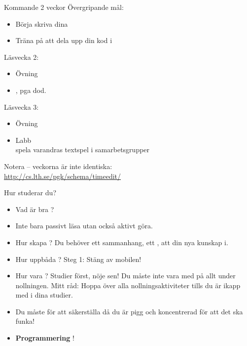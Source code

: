 \begin{SlideExtra}{Kommande 2 veckor}
Övergripande mål:
\begin{itemize}
\item Börja skriva dina 
\item Träna på att dela upp din kod i 
\end{itemize}

Läsvecka 2:
\begin{itemize}
\item Övning \texttt{\ExeWeekTWO}
\item {} , pga dod.
\end{itemize}
Läsvecka 3:
\begin{itemize}
\item Övning \texttt{\ExeWeekTHREE}
\item Labb \texttt{\LabWeekTHREE}  \\ spela varandras textspel i samarbetsgrupper
\end{itemize}

\vspace{1em} Notera  -- veckorna är inte identiska:\\\url{http://cs.lth.se/pgk/schema/timeedit/}

\end{SlideExtra}




\begin{SlideExtra}{Hur studerar du?}
\begin{itemize}
\item Vad är bra ?
\item {} Inte bara passivt läsa utan också aktivt göra.
\item Hur skapa ?
Du behöver ett sammanhang, ett , att  din nya kunskap i.
\item Hur uppbåda ? Steg 1: Stäng av mobilen!
\item Hur vara ? Studier först, nöje sen! Du måste inte vara med på allt under nollningen. Mitt råd: Hoppa över alla nollningsaktiviteter tills du är ikapp med i dina studier.
\item Du måste  för att säkerställa  då du är pigg och koncentrerad för att det ska funka!
\item \textbf{Programmering}  !
\end{itemize}
\end{SlideExtra}


